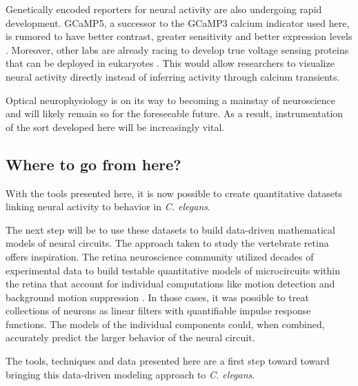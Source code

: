 Genetically encoded reporters for  neural activity are also undergoing rapid development. GCaMP5, a successor to the GCaMP3 calcium indicator used here, is rumored to  have better contrast, greater sensitivity and better expression levels \citep{hires_gcamp5_2011}. Moreover, other labs are already racing to develop true voltage sensing proteins that can be deployed in eukaryotes \citep{kralj_electrical_2011}. This would allow researchers to visualize neural activity directly instead of inferring activity through calcium transients. 

	Optical neurophysiology is on its way to becoming a mainstay of neuroscience and will likely remain so for the foreseeable future. 
As a result, instrumentation of the sort developed here will be increasingly vital. 




\subsection*{Where to go from here?}
With the tools presented here, it is now possible to  create  quantitative datasets linking neural activity to behavior in \textit{C. elegans}.

 The next step will be to use these datasets to  build data-driven mathematical models of neural circuits. The approach taken to study the vertebrate retina offers inspiration. The retina neuroscience community utilized decades of experimental data to  build  testable quantitative  models of microcircuits within the retina that account for individual computations like motion detection and background motion suppression \citep{baccus_retinal_2008, gollisch_eye_2010}. In those cases, it was possible to treat collections of neurons as linear filters with quantifiable  impulse response functions. The models of the individual components could, when combined, accurately predict the larger behavior of the neural circuit. 

The tools, techniques and data presented here are a first step toward toward bringing this data-driven  modeling approach to \textit{C. elegans}.




 





